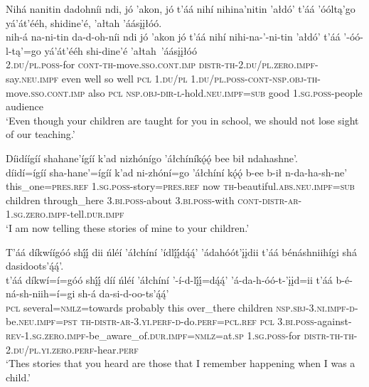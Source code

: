 \ea\label{ex:text6-16-36}
Nihá nanitin dadohníi ndi, jó ’akon, jó t’áá nihí nihina’nitin ’ałdó’ t’áá ’óóltą’go yá’át’ééh, shidine’é, ’ałtah ’áásįįłóó.\\
\gll nih-á	na-ni-tin	da-d-oh-níi	ndi	jó	’akon	jó	t’áá nihí	nihi-na-’-ni-tin	’ałdó’	t’áá	’-óó-l-tą’=go	yá’át’ééh	shi-dine’é	’ałtah~{’áásįįłóó}\\
     2.\textsc{du}/\textsc{pl}.\textsc{poss}-for	\textsc{cont}-\textsc{th}-move.\textsc{sso}.\textsc{cont}.\textsc{imp}	\textsc{distr}-\textsc{th}-2.\textsc{du}/\textsc{pl}.\textsc{zero}.\textsc{impf}-say.\textsc{neu}.\textsc{impf}	even	well	so	well	\textsc{pcl} 1.\textsc{du}/\textsc{pl}	1.\textsc{du}/\textsc{pl}.\textsc{poss}-\textsc{cont}-\textsc{nsp}.\textsc{obj}-\textsc{th}-move.\textsc{sso}.\textsc{cont}.\textsc{imp}	also	\textsc{pcl}	\textsc{nsp}.\textsc{obj}-\textsc{dir}-\textsc{l}-hold.\textsc{neu}.\textsc{impf}=\textsc{sub}	good	1.\textsc{sg}.\textsc{poss}-people	audience\\
\glt `Even though your children are taught for you in school, we should not lose sight of our teaching.'
\z

\ea\label{ex:text6-16-37}
Díidíígíí shahane’ígíí k’ad nizhónígo ’áłchíníkǫ́ǫ́ bee bił ndahashne’.\\
\gll díidí=ígíí	sha-hane’=ígíí	k’ad	ni-zhóní=go	’áłchíní kǫ́ǫ́	b-ee	b-ił	n-da-ha-sh-ne’\\
     this\_one=\textsc{pres}.\textsc{ref}	1.\textsc{sg}.\textsc{poss}-story=\textsc{pres}.\textsc{ref}	now	\textsc{th}-beautiful.\textsc{abs}.\textsc{neu}.\textsc{impf}=\textsc{sub}	children through\_here	3.\textsc{bi}.\textsc{poss}-about	3.\textsc{bi}.\textsc{poss}-with	\textsc{cont}-\textsc{distr}-\textsc{ar}-1.\textsc{sg}.\textsc{zero}.\textsc{impf}-tell.\textsc{dur}.\textsc{impf}\\
\glt `I am now telling these stories of mine to your children.'
\z

\ea\label{ex:text6-16-38}
T’áá díkwíígóó shį́į́ dii ńléí ’áłchíní ’ídlį́į́dą́ą́’ ’ádahóót’įįdii t’áá bénáshniihígi shá dasidoots’ą́ą́’.\\
\gll t’áá	díkwí=í=góó	shį́į́	díí	ńléí	’áłchíní	’-í-d-lį́į́=dą́ą́’	’á-da-h-óó-t-’įįd=ii	t’áá	b-é-ná-sh-niih=í=gi	sh-á	da-si-d-oo-ts’ą́ą́’\\
     \textsc{pcl}	several=\textsc{nmlz}=towards	probably	this	over\_there	children	\textsc{nsp}.\textsc{sbj}-3.\textsc{ni}.\textsc{impf}-\textsc{d}-be.\textsc{neu}.\textsc{impf}=\textsc{pst}	\textsc{th}-\textsc{distr}-\textsc{ar}-3.\textsc{yi}.\textsc{perf}-\textsc{d}-do.\textsc{perf}=\textsc{pcl}.\textsc{ref}	\textsc{pcl}	3.\textsc{bi}.\textsc{poss}-against-\textsc{rev}-1.\textsc{sg}.\textsc{zero}.\textsc{impf}-be\_aware\_of.\textsc{dur}.\textsc{impf}=\textsc{nmlz}=at.\textsc{sp}	1.\textsc{sg}.\textsc{poss}-for	\textsc{distr}-\textsc{th}-\textsc{th}-2.\textsc{du}/\textsc{pl}.\textsc{yi}.\textsc{zero}.\textsc{perf}-hear.\textsc{perf}\\
\glt `Thes stories that you heard are those that I remember happening when I was a child.'
\z

